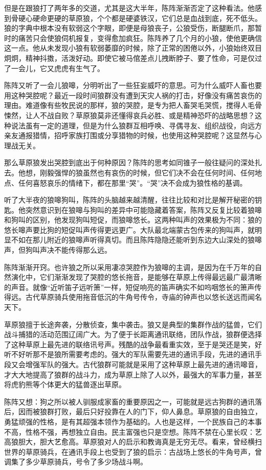 \par 但是在跟狼打了两年多的交道，尤其是这大半年，陈阵渐渐否定了这种看法。他感到骨硬心硬命更硬的草原狼，个个都是硬婆铁汉，它们总是血战到底，死不低头。狼的字典中根本没有软弱这个字眼，即便是母狼丧子，公狼受伤，断腿断爪，那暂时的痛苦只会使狼伺机报复，变得愈加疯狂。陈阵养了几个月的小狼，使他更确信这一点。他从未发现小狼有软弱萎靡的时候，除了正常的困倦以外，小狼始终双目炯炯，精神抖擞，活泼好动。即使它被马倌差点儿拽断脖子、要了性命，可是仅过了一会儿，它又虎虎有生气了。
\par 陈阵又听了一会儿狼嗥，分明听出了一些狂妄威吓的意思。可为什么威吓人畜也要用这种哭腔呢？最近一段时间狼群没有遭到天灾人祸的打击，好像没有痛苦哀伤的理由。难道像有些牧民说的那样，狼的哭腔，是专为把人畜哭毛哭慌，搅得人毛骨悚然，让人不战自败？草原狼莫非还懂得哀兵必胜、或是精神恐吓的战略思想？这种说法虽有一定的道理，但是为什么狼群互相呼唤、寻偶寻友、组织战役，向远方亲友通报猎情，招呼家族打围或分享猎物的时候，也使用这种哭腔呢？这显然与心理战无关。
\par 那么草原狼发出哭腔到底出于何种原因？陈阵的思考如同锥子一般往疑问的深处扎去。他想，刚毅强悍的狼虽然也有哀伤的时候，但它们决不会在任何时间、任何地点、任何喜怒哀乐的情绪下，都在那里“哭”。“哭”决不会成为狼性格的基调。
\par 听了大半夜的狼嗥狗叫，陈阵的头脑越来越清醒，往往比较和对比是解开秘密的钥匙。他突然意识到在狼嗥与狗叫的差异中可能隐藏着答案，陈阵又反复比较着狼嗥和狗叫的区别，他发现狗叫短促，而狼嗥悠长。这两种叫声的效果极为不同：狼的悠长嗥声要比狗的短促叫声传得更远更广。大队最北端蒙古包传来的狗叫声，就明显不如在那儿附近的狼嗥声听得真切。而且陈阵隐隐还能听到东边大山深处的狼嗥声，但狗叫声决不能传得那么远。
\par 陈阵渐渐开窍。也许狼之所以采用凄凉哭腔作为狼嗥的主调，是因为在千万年的自然演化中，它们渐渐发现了哭腔的悠长拖音，是能够在草原上传得最远最广最清晰的声音。就像“近听笛子远听箫”一样，短促响亮的笛声确实不如呜咽悠长的箫声传得远。古代草原骑兵使用拖音低沉的牛角号传令，寺庙的钟声也以悠长送远而闻名天下。
\par 草原狼擅于长途奔袭，分散侦查，集中袭击。狼又是典型的集群作战的猛兽，它们战斗捕猎的活动范围辽阔广大。为了便于长距离通讯联络，团队作战，狼群便选择了这种草原上最先进的联络讯号声。残酷的战争最看重实效，至于是哭还是笑，好听不好听那不是狼所需要考虑的。强大的军队需要先进的通讯手段，先进的通讯手段又会增强军队的强大。古代狼群可能就是采用了这种草原上最先进的通讯嗥音，才大大地提高了狼群的战斗力，成为草原上除了人以外，最强大的军事力量，甚至将虎豹熊等个体更大的猛兽逐出草原。
\par 陈阵又想：狗之所以被人驯服成家畜的重要原因之一，可能就是远古狗群的通讯落后，因而被狼群打败，最后只好投靠在人的门下，仰人鼻息。草原狼的自由独立，勇猛顽强的性格，是有其超强本领作为基础的。人也是这样，一个民族自己的本事不高，性格不强，再想独立自由。民主富强也只是空想。陈阵不禁在心里长叹：艺高狼胆大，胆大艺愈高。草原狼对人的启示和教诲真是无穷无尽。看来，曾经横扫世界的草原骑兵，在通讯手段上也受到了狼的启示：古战场上悠长的牛角号声，曾调集了多少草原骑兵，号令了多少场战斗啊。
